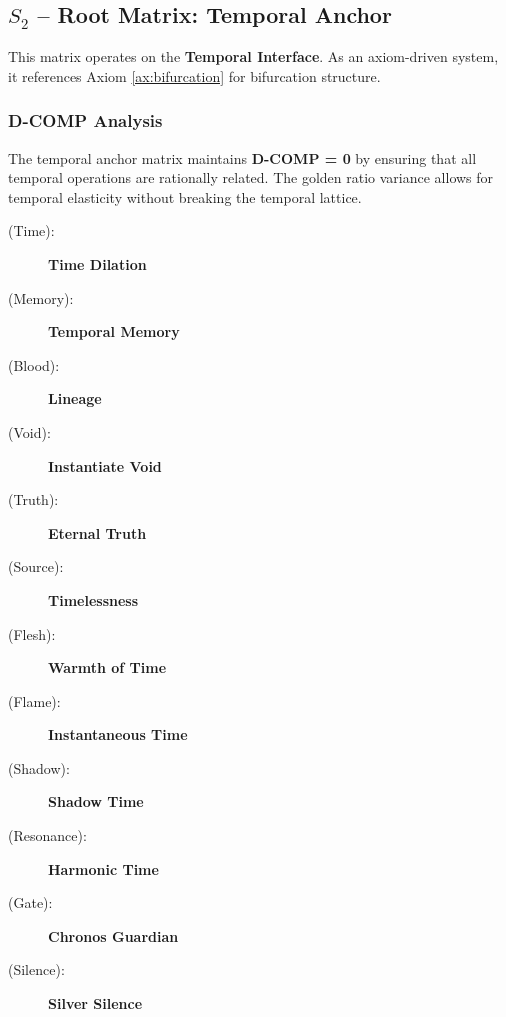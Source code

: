 \subsection{$S_{2}$ -- Root Matrix: Temporal Anchor}\label{sec:19.0.2}

This matrix operates on the \textbf{Temporal Interface}. As an axiom-driven system, it references Axiom \ref{ax:bifurcation} for bifurcation structure.

\subsubsection{D-COMP Analysis}

The temporal anchor matrix maintains \textbf{D-COMP = 0} by ensuring that all temporal operations are rationally related. The golden ratio variance allows for temporal elasticity without breaking the temporal lattice.
\begin{description}
    \item[(Time):] \fetusuhn {} \textbf{Time Dilation} \\
    \item[(Memory):] \kallur {} \textbf{Temporal Memory} \\
    \item[(Blood):] \babdhkor {} \textbf{Lineage} \\
    \item[(Void):] \ahnnym {} \textbf{Instantiate Void} \\
    \item[(Truth):] \veltar {} \textbf{Eternal Truth} \\
    \item[(Source):] \sorlun {} \textbf{Timelessness} \\
    \item[(Flesh):] \kothsens {} \textbf{Warmth of Time}  \\
    \item[(Flame):] \drehur {} \textbf{Instantaneous Time} \\
    \item[(Shadow):] \rheazohm {} \textbf{Shadow Time} \\
    \item[(Resonance):] \zhekser {} \textbf{Harmonic Time} \\
    \item[(Gate):] \shavrist {} \textbf{Chronos Guardian} \\
    \item[(Silence):] \trigpehl {} \textbf{Silver Silence} \\
\end{description}

